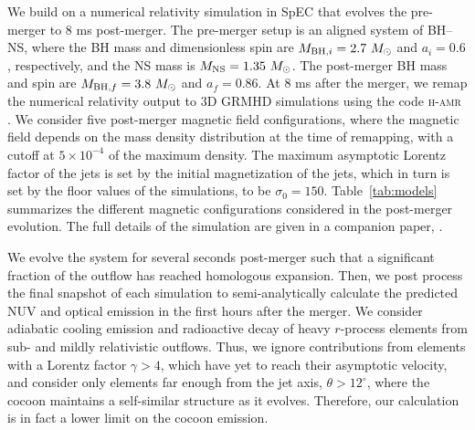 \documentclass[twocolumn,dvipsnames]{aastex62}
\newcommand{\msun}{\,{M_{\odot}}}
\begin{document}
We build on a numerical relativity simulation in SpEC \citep{spec} that evolves the pre-merger to 8 ms post-merger. The pre-merger setup is an aligned system of BH--NS, where the BH mass and dimensionless spin are $ M_{{\rm BH},i} = 2.7\,\msun $ and $ a_i = 0.6 $, respectively, and the NS mass is $ M_{\rm NS} = 1.35\,\msun $. The post-merger BH mass and spin are $ M_{{\rm BH},f} = 3.8\,\msun $ and $ a_f = 0.86 $.
At 8 ms after the merger, we remap the numerical relativity output to 3D GRMHD simulations using the code \textsc{h-amr} \citep{Liska2022}. We consider five post-merger magnetic field configurations, where the magnetic field depends on the mass density distribution at the time of remapping, with a cutoff at $ 5\times 10^{-4} $ of the maximum density. The maximum asymptotic Lorentz factor of the jets is set by the initial magnetization of the jets, which in turn is set by the floor values of the simulations, to be $ \sigma_0 = 150 $.
Table~\ref{tab:models} summarizes the different magnetic configurations considered in the post-merger evolution. The full details of the simulation are given in a companion paper, \citet{Gottlieb2023}.

We evolve the system for several seconds post-merger such that a significant fraction of the outflow has reached homologous expansion. Then, we post process the final snapshot of each simulation to semi-analytically calculate the predicted NUV and optical emission in the first hours after the merger. We consider adiabatic cooling emission and radioactive decay of heavy $r$-process elements from sub- and mildly relativistic outflows. Thus, we ignore contributions from elements with a Lorentz factor $ \gamma > 4 $, which have yet to reach their asymptotic velocity, and consider only elements far enough from the jet axis, $ \theta > 12^\circ $, where the cocoon maintains a self-similar structure as it evolves. Therefore, our calculation is in fact a lower limit on the cocoon emission.
\end{document}
